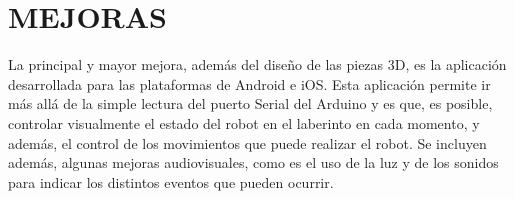 \chapter{ MEJORAS}


La principal y mayor mejora, además del diseño de las piezas 3D, es la aplicación desarrollada para las plataformas de Android e iOS. Esta aplicación permite ir más allá de la simple lectura del puerto Serial del Arduino y es que, es posible, controlar visualmente el estado del robot en el laberinto en cada momento, y además, el control de los movimientos que puede realizar el robot. Se incluyen además, algunas mejoras audiovisuales, como es el uso de la luz y de los sonidos para indicar los distintos eventos que pueden ocurrir.

